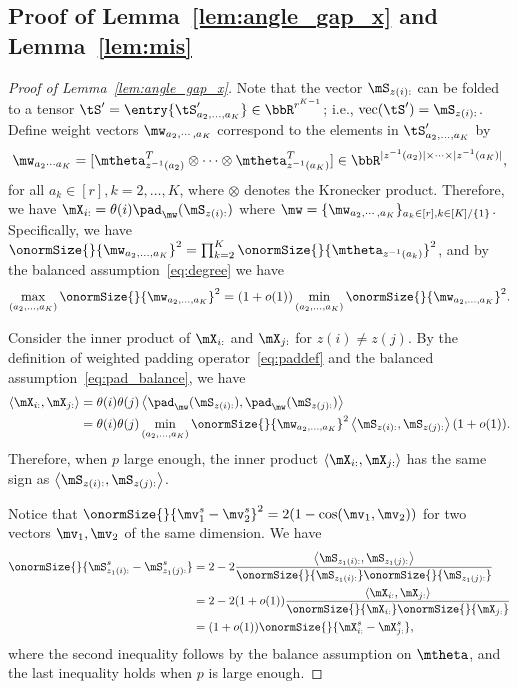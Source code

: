 \documentclass[lettersize,onecolumn,journal]{IEEEtran}
\theoremstyle{definition}
\theoremstyle{definition}
\newcommand{\ang}[1]{\left\langle#1\right\rangle}
\begin{document}
{
  

\subsection{Proof of Lemma~\ref{lem:angle_gap_x} and Lemma~\ref{lem:mis}}

\begin{proof}[Proof of Lemma~\ref{lem:angle_gap_x}] 

Note that the vector $\mS_{z(i):}$ can be folded to a tensor $\tS' =\entry{\tS'_{a_2,\ldots,a_K}} \in \bbR^{r^{K-1}}$; i.e., $\text{vec}(\tS') = \mS_{z(i):}$. Define weight vectors $\mw_{a_2, \cdots, a_K}$ correspond to the elements in $\tS'_{a_2,\ldots,a_K}$ by
\begin{equation}
    \mw_{a_2 \cdots a_K} = [ \mtheta_{z^{-1} (a_2)}^T \otimes \cdots \otimes \mtheta_{z^{-1} (a_K)}^T] \in \bbR^{|z^{-1} (a_2)| \times \cdots \times |z^{-1} (a_K)|},
\end{equation}
for all $a_k \in [r], k = 2,\ldots, K$, where $\otimes$ denotes the Kronecker product. Therefore, we have  $\mX_{i:} = \theta(i) \pad_{\mw}(\mS_{z(i):})$ where $\mw = \{ \mw_{a_2, \cdots, a_K}\}_{a_k \in [r], k\in [K]/\{1\}}$. Specifically, we have $\onormSize{}{\mw_{a_2, \ldots, a_K}}^2 = \prod_{k = 2}^K \onormSize{}{ \mtheta_{z^{-1}(a_k)}}^2$, and by the balanced assumption~\eqref{eq:degree} we have 
\begin{equation}\label{eq:pad_balance}
    \max_{(a_2,\ldots, a_K)} \onormSize{}{\mw_{a_2,\ldots, a_K}}^2 = (1 + o(1))  \min_{(a_2,\ldots, a_K)} \onormSize{}{\mw_{a_2,\ldots, a_K}}^2.
\end{equation}

Consider the inner product of $\mX_{i:}$ and $\mX_{j:}$ for $z(i) \neq z(j)$. By the definition of weighted padding operator~\eqref{eq:paddef} and the balanced assumption~\eqref{eq:pad_balance}, we have 
\begin{align}
    \ang{\mX_{i:},\mX_{j:}} &= \theta(i) \theta(j) \ang{ \pad_{\mw}(\mS_{z(i):}), \pad_{\mw}(\mS_{z(j):} )}\\
    &= \theta(i) \theta(j) \min_{(a_2,\ldots, a_K)} \onormSize{}{\mw_{a_2,\ldots, a_K}}^2 \ang{\mS_{z(i):}, \mS_{z(j):}}(1 + o(1)).
\end{align}
Therefore, when $p$ large enough, the inner product $\ang{\mX_{i:},\mX_{j:}} $ has the same sign as $\ang{\mS_{z(i):}, \mS_{z(j):}}$. 

{
   

Notice that $\onormSize{}{\mv_1^s - \mv_2^s}^2 =  2(1 - \cos(\mv_1, \mv_2))$ for two vectors $\mv_1, \mv_2$ of the same dimension. We have 
\begin{align}
    \onormSize{}{\mS_{z_1(i):}^s - \mS_{z_1(j):}^s}  &= 2 - 2 \frac{ \ang{  \mS_{z_1(i):}, \mS_{z_1(j):} }}{ \onormSize{}{\mS_{z_1(i):}} \onormSize{}{\mS_{z_1(j):}} } \\
    & = 2 - 2 (1+o(1))\frac{ \ang{  \mX_{i:}, \mX_{j:} }}{ \onormSize{}{ \mX_{i:}} \onormSize{}{ \mX_{j:}} } \\
    & = (1 + o(1)) \onormSize{}{\mX_{i:}^s - \mX_{j:}^s},
\end{align}
where the second inequality follows by the balance assumption on $\mtheta$, and the last inequality holds when $p$ is large enough. 

}
\end{proof}}
\end{document}
